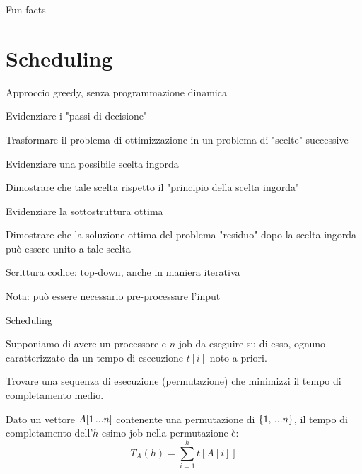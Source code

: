 \begin{OnlySlides}{Fun facts}
\vspace{-12pt}
\end{OnlySlides}


\section{Scheduling}

\begin{frame}{Approccio greedy, senza programmazione dinamica}


\BIL
\item \alert{Evidenziare i "passi di decisione"}
\BI
\item Trasformare il problema di ottimizzazione in un problema di "scelte" successive
\EI

\item \alert{Evidenziare una possibile scelta ingorda}
\BI
\item Dimostrare che tale scelta rispetto il "principio della scelta ingorda"
\EI

\item \alert{Evidenziare la sottostruttura ottima}
\BI
\item Dimostrare che la soluzione ottima del problema "residuo" dopo la scelta ingorda può essere unito a tale scelta
\EI

\item \alert{Scrittura codice: top-down, anche in maniera iterativa}
\BI
\item Nota: può essere necessario pre-processare l'input
\EI
\EIL
\end{frame}



\begin{frame}{Scheduling}

\vspace{-6pt}
\begin{myboxtitle}[Input]
	
Supponiamo di avere un processore e $n$ job da eseguire su di esso,
ognuno caratterizzato da un tempo di esecuzione $t[i]$ noto a priori.
\end{myboxtitle}

\begin{myboxtitle}[Problema]
Trovare una sequenza di esecuzione (permutazione) che minimizzi il \alert{tempo di completamento medio}.
\end{myboxtitle}

\begin{myboxtitle}

Dato un vettore $A[1 \mydots n]$ contenente una	permutazione di $\{ 1, \mydots n \}$,
il \alert{tempo di completamento} dell'$h$-esimo job nella permutazione è:
\[
  T_A(h) = \sum_{i=1}^h t[A[i]]
\] 
\end{myboxtitle}

\end{frame}	

